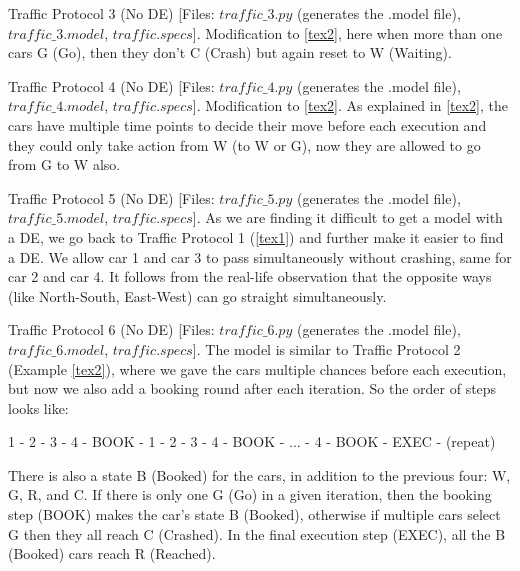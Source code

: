 \documentclass[format=acmsmall, review=false]{acmart}
\begin{document}
\begin{example}\label{tex3}
Traffic Protocol 3 (No DE) [Files: $traffic\_3.py$ (generates the .model file), $traffic\_3.model$, $traffic.specs$]. Modification to \ref{tex2}, here when more than one cars G (Go), then they don't C (Crash) but again reset to W (Waiting).
\end{example}

\begin{example}\label{tex4}
Traffic Protocol 4 (No DE) [Files: $traffic\_4.py$ (generates the .model file), $traffic\_4.model$, $traffic.specs$]. Modification to \ref{tex2}. As explained in \ref{tex2}, the cars have multiple time points to decide their move before each execution and they could only take action from W (to W or G), now they are allowed to go from G to W also.
\end{example}

\begin{example}\label{tex5}
Traffic Protocol 5 (No DE) [Files: $traffic\_5.py$ (generates the .model file), $traffic\_5.model$, $traffic.specs$]. As we are finding it difficult to get a model with a DE, we go back to Traffic Protocol 1 (\ref{tex1}) and further make it easier to find a DE. We allow car 1 and car 3 to pass simultaneously without crashing, same for car 2 and car 4. It follows from the real-life observation that the opposite ways (like North-South, East-West) can go straight simultaneously.
\end{example}

\begin{example}\label{tex6}
Traffic Protocol 6 (No DE) [Files: $traffic\_6.py$ (generates the .model file), $traffic\_6.model$, $traffic.specs$]. The model is similar to Traffic Protocol 2 (Example \ref{tex2}), where we gave the cars multiple chances before each execution, but now we also add a booking round after each iteration. So the order of steps looks like:

1 - 2 - 3 - 4 - BOOK - 1 - 2 - 3 - 4 - BOOK - ... - 4 - BOOK - EXEC - (repeat)

There is also a state B (Booked) for the cars, in addition to the previous four: W, G, R, and C. If there is only one G (Go) in a given iteration, then the booking step (BOOK) makes the car's state B (Booked), otherwise if multiple cars select G then they all reach C (Crashed). In the final execution step (EXEC), all the B (Booked) cars reach R (Reached).
\end{example}
\end{document}
